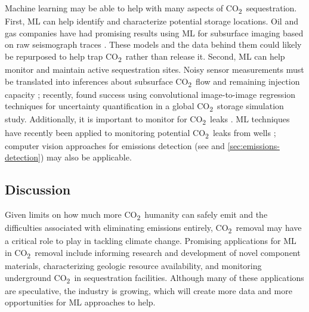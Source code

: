 \documentclass[11pt]{report}
\newcommand{\carbon}{\texorpdfstring{CO\textsubscript{2}}{CO2}}
\begin{document}
Machine learning may be able to help with many aspects of \carbon~sequestration.
First, ML can help identify and characterize potential storage locations. Oil and gas companies have had promising results using ML for subsurface imaging based on raw seismograph traces \cite{araya2018deep}. These models and the data behind them could likely be repurposed to help trap \carbon~rather than release it.
Second, ML can help monitor and maintain active sequestration sites. Noisy sensor measurements must be translated into inferences about subsurface \carbon~flow and remaining injection capacity \cite{celia2015status}; recently, \cite{mo2019deep} found success using convolutional image-to-image regression techniques for uncertainty quantification in a global \carbon~storage simulation study. Additionally, it is important to monitor for \carbon~leaks \cite{moriarty2014rapid}. ML techniques have recently been applied to
monitoring potential \carbon~leaks from wells \cite{chen2018geologic}; computer vision approaches for emissions detection (see \cite{wang2019machine} and \textsection\ref{sec:emissions-detection}) may also be applicable.

\subsection{Discussion}
Given limits on how much more \carbon~humanity can safely emit and the difficulties associated with eliminating emissions entirely, \carbon~removal may have a critical role to play in tackling climate change.
Promising applications for ML in  \carbon~removal include informing research and development of novel component materials, characterizing geologic resource availability, and monitoring underground \carbon~in sequestration facilities.
Although many of these applications are speculative, the industry is growing, which will create more data and more opportunities for ML approaches to help.
\end{document}
